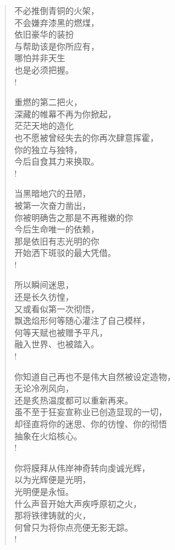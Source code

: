 \documentclass[UTF8, 12pt, a4paper]{ctexrep} %
\begin{document}
\begin{verse}

    不必推倒青铜的火架，\\
    不会嫌弃漆黑的燃煤，\\
    依旧豪华的装扮\\
    与帮助该是你所应有，\\
    哪怕并非天生\\
    也是必须把握。\\!

    重燃的第二把火，\\
    深藏的帷幕不再为你掀起，\\
    茫茫天地的造化\\
    也不愿被曾经失去的你再次肆意挥霍，\\
    你的独立与独特，\\
    今后自食其力来换取。\\!

    当黑暗地穴的丑陋，\\
    被第一次奋力凿出，\\
    你被明确告之那是不再稚嫩的你\\
    今后生命唯一的依赖，\\
    那是依旧有志光明的你\\
    开始洒下斑驳的最大凭借。\\!

    所以瞬间迷思，\\
    还是长久彷惶，\\
    又或看似第一次彻悟，\\
    飘逸焰形何等随心灌注了自己模样，\\
    何等天赋也被赠予平凡，\\
    融入世界、也被踏入。\\!

    你知道自己再也不是伟大自然被设定造物，\\
    无论冷冽风向，\\
    还是炙热温度都可以重新再来。\\
    虽不至于狂妄宣称业已创造显现的一切，\\
    却径直将你的迷思、你的彷惶、你的彻悟\\
    抽象在火焰核心。\\!

    你将膜拜从伟岸神奇转向虔诚光辉，\\
    以为光辉便是光明，\\
    光明便是永恒。\\
    什么声音开始大声疾呼原初之火，\\
    那将铁律铸就的火，\\
    何曾只为将你点亮便无影无踪。\\!


\end{verse}
\end{document}
